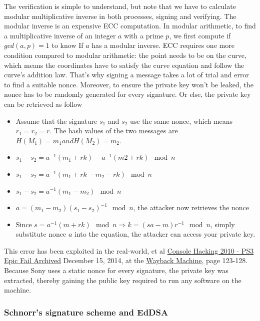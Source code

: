 The verification is simple to understand, but note that we have to calculate modular multiplicative inverse in both processes, signing and verifying. The modular inverse is an expensive ECC computation. In modular arithmetic, to find a multiplicative inverse of an integer $a$ with a prime $p$, we first compute if $gcd(a, p) = 1$ to know If $a$ has a modular inverse. ECC requires one more condition compared to modular arithmetic: the point needs to be on the curve, which means the coordinates have to satisfy the curve equation and follow the curve’s addition law. That’s why signing a message takes a lot of trial and error to find a suitable nonce. Moreover, to ensure the private key won’t be leaked, the nonce has to be randomly generated for every signature. Or else, the private key can be retrieved as follow

\begin{itemize}
  \item Assume that the signature $s_1$ and $s_2$ use the same nonce, which means $r_1 = r_2 = r$. The hash values of the two messages are $H(M_1) = m_1 and H(M_2) = m_2$.
  \item $s_1 - s_2 = a^{-1} (m_1 + rk) - a^{-1} (m2+rk) \mod n$
  \item $s_1 - s_2 = a^{-1}(m_1 + rk - m_2 - rk) \mod n$
  \item $s_1 - s_2 = a^{-1}(m_1 - m_2) \mod n$
  \item $a = (m_1 - m_2)(s_1 - s_2)^{-1} \mod n$, the attacker now retrieves the nonce
  \item Since $s = a^{-1}(m + rk) \mod n \Rightarrow k = (sa-m) r^{-1} \mod n$, simply substitute nonce $a$ into the equation, the attacker can access your private key.
\end{itemize}

This error has been exploited in the real-world, et al \href{https://events.ccc.de/congress/2010/Fahrplan/attachments/1780_27c3_console_hacking_2010.pdf}{Console Hacking 2010 - PS3 Epic Fail Archived} December 15, 2014, at the \href{https://en.wikipedia.org/wiki/Wayback_Machine}{Wayback Machine}, page 123-128. Because Sony uses a static nonce for every signature, the private key was extracted, thereby gaining the public key required to run any software on the machine.


\subsubsection{Schnorr’s signature scheme and EdDSA}

